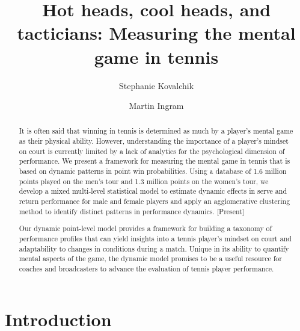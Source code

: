 \documentclass{Latex/svjour3}
\begin{document}
\title{Hot heads, cool heads, and tacticians: Measuring the mental
  game in tennis}



\author{Stephanie Kovalchik\and Martin Ingram}


\date{}


\maketitle

\begin{abstract}
It is often said that winning in tennis is determined as much by a
player's mental game as their physical ability. However, understanding the importance of a player's mindset on
court is currently limited by a lack of analytics for 
the psychological dimension of performance. We present a framework for
measuring the mental game in tennis that is based on dynamic patterns
in point win probabilities. Using a database of 1.6
million points played on the men's tour and 1.3 million points on the
women's tour, we develop a mixed multi-level statistical model to
estimate dynamic effects in serve and return performance for male and
female players and apply an agglomerative clustering method to
identify distinct patterns in performance dynamics. [Present]

Our dynamic point-level model provides a framework for building a taxonomy of performance
profiles that can yield insights into a tennis player's mindset on court and
adaptability to changes in conditions during a match. Unique in its
ability to quantify mental aspects of the game, the dynamic model
promises to be a
useful resource for coaches and broadcasters to advance the evaluation
of tennis player performance.
\end{abstract}

\section{Introduction}
\end{document}
